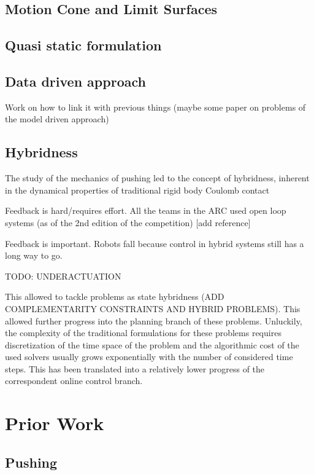 \documentclass[12,twoside]{TFG-GM}
\theoremstyle{definition}
\theoremstyle{remark}
\begin{document}
\subsection{Motion Cone and Limit Surfaces}
\label{subsec:motioncone}

\subsection{Quasi static formulation}
\label{subsec:quasistatic}

\subsection{Data driven approach}
\label{subsec:datadriven} 

Work on how to link it with previous things (maybe some paper on problems of the model driven approach)

\subsection{Hybridness}
\label{subsec:hybridness}

The study of the mechanics of pushing led to the concept of hybridness, inherent in the dynamical properties of traditional rigid body Coulomb contact  

Feedback is hard/requires effort. All the teams in the ARC used open loop systems (as of the 2nd edition of the competition) [add reference]

Feedback is important. Robots fall because control in hybrid systems still has a long way to go.

TODO: UNDERACTUATION


This allowed to tackle problems as state hybridness (ADD COMPLEMENTARITY CONSTRAINTS AND HYBRID PROBLEMS). This allowed further progress into the planning branch of these problems. Unluckily, the complexity of the traditional formulations for these problems requires discretization of the time space of the problem and the algorithmic cost of the used solvers usually grows exponentially with the number of considered time steps. This has been translated into a relatively lower progress of the correspondent online control branch.

\section{Prior Work}
\label{sec:priorWork}

\subsection{Pushing}
\label{subsec:pushing}
\end{document}
